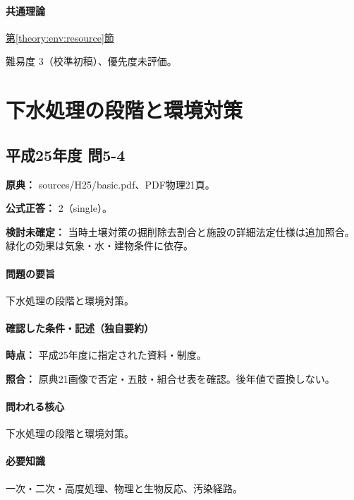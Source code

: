 \paragraph{共通理論} \hyperref[theory:env:resource]{第\ref*{theory:env:resource}節}

\par 難易度 3（校準初稿）、優先度未評価。

\section{下水処理の段階と環境対策}

\subsection{平成25年度 問5-4}
\label{q:h25-reg-basic-5-4}

\noindent\textbf{原典：} sources/H25/basic.pdf、PDF物理21頁。

\textbf{公式正答：} 2（single）。

\par\textbf{検討未確定：} 当時土壌対策の掘削除去割合と施設の詳細法定仕様は追加照合。緑化の効果は気象・水・建物条件に依存。

\paragraph{問題の要旨} 下水処理の段階と環境対策。

\paragraph{確認した条件・記述（独自要約）}\mbox{}\par

\noindent\textbf{時点：} 平成25年度に指定された資料・制度。\par

\noindent\textbf{照合：} 原典21画像で否定・五肢・組合せ表を確認。後年値で置換しない。\par

\paragraph{問われる核心} 下水処理の段階と環境対策。

\paragraph{必要知識} 一次・二次・高度処理、物理と生物反応、汚染経路。

